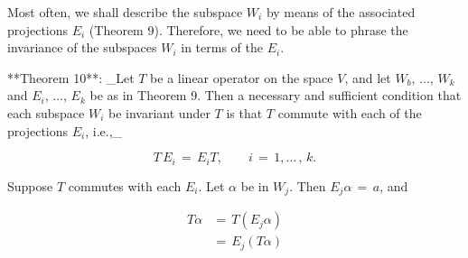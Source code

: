 Most often, we shall describe the subspace \(W_{i}\) by means of the associated projections \(E_{i}\) (Theorem 9). Therefore, we need to be able to phrase the invariance of the subspaces \(W_{i}\) in terms of the \(E_{i}\).

**Theorem 10**: _Let \(T\) be a linear operator on the space \(V\), and let \(W_{b}\), \(\ldots\), \(W_{k}\) and \(E_{i}\), \(\ldots\), \(E_{k}\) be as in Theorem 9. Then a necessary and sufficient condition that each subspace \(W_{i}\) be invariant under \(T\) is that \(T\) commute with each of the projections \(E_{i}\), i.e.,_

\[T\,E_{i}\,=\,E_{i}T,\qquad i\,=\,1,\ldots\,,\,k.\]

Suppose \(T\) commutes with each \(E_{i}\). Let \(\alpha\) be in \(W_{j}\). Then \(E_{j}\alpha\,=\,a\), and

\[\begin{array}{rl}T\alpha&=\,T(E_{j}\alpha)\\ &=\,E_{j}(T\alpha)\end{array}\] 